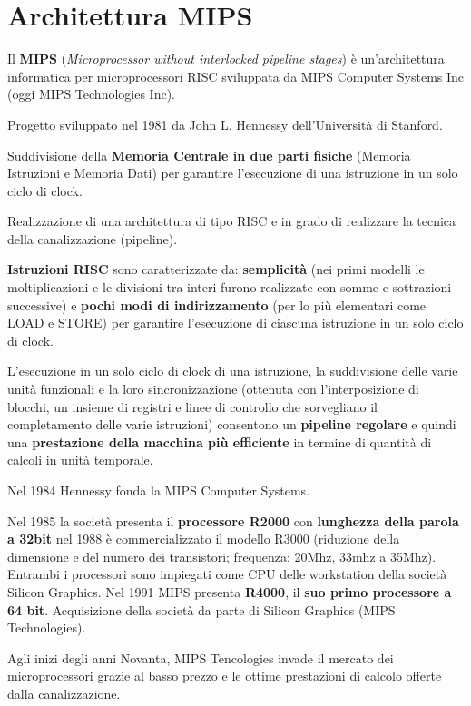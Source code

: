 \documentclass[12pt]{article}
\begin{document}
\section{Architettura MIPS}
Il \textbf{MIPS} (\textit{Microprocessor without interlocked pipeline stages}) è un’architettura informatica per microprocessori RISC sviluppata da MIPS Computer Systems Inc (oggi MIPS Technologies Inc).\par\medskip\noindent
Progetto sviluppato nel 1981 da John L. Hennessy dell’Università di Stanford.\par\medskip\noindent 
Suddivisione della \textbf{Memoria Centrale in due parti fisiche} (Memoria Istruzioni e Memoria Dati) per garantire l'esecuzione di una istruzione in un solo ciclo di clock. \par\medskip\noindent 
Realizzazione di una architettura di tipo RISC e in grado di realizzare la tecnica della canalizzazione (pipeline).\par\medskip\noindent
\textbf{Istruzioni RISC} sono caratterizzate da: \textbf{semplicità} (nei primi modelli le moltiplicazioni e le divisioni tra interi furono realizzate con somme e sottrazioni successive) e \textbf{pochi modi di indirizzamento} (per lo più elementari come LOAD e STORE) per garantire l’esecuzione di ciascuna istruzione in un solo ciclo di clock. \par\medskip\noindent
L’esecuzione in un solo ciclo di clock di una istruzione, la suddivisione delle varie unità funzionali e la loro sincronizzazione (ottenuta con l'interposizione di blocchi, un insieme di registri e linee di controllo che sorvegliano il completamento delle varie istruzioni) consentono un \textbf{pipeline regolare} e quindi una \textbf{prestazione della macchina più efficiente} in termine di quantità di calcoli in unità temporale.\par\medskip\noindent
Nel 1984 Hennessy fonda la MIPS Computer Systems.\par\medskip\noindent 
Nel 1985 la società presenta il \textbf{processore R2000} con \textbf{lunghezza della parola a 32bit} nel 1988 è commercializzato il modello R3000 (riduzione della dimensione e del numero dei transistori; frequenza: 20Mhz, 33mhz a 35Mhz). Entrambi i processori sono impiegati come CPU delle workstation della società Silicon Graphics.
Nel 1991 MIPS presenta \textbf{R4000}, il \textbf{suo primo processore a 64 bit}. Acquisizione della società da parte di Silicon Graphics (MIPS Technologies).\par\medskip\noindent
Agli inizi degli anni Novanta, MIPS Tencologies invade il mercato dei microprocessori grazie al basso prezzo e le ottime prestazioni di calcolo offerte dalla canalizzazione.\par\medskip\noindent 
\end{document}
